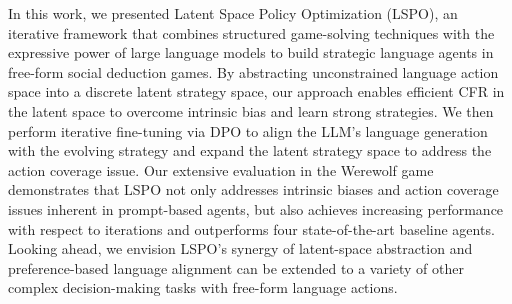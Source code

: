 In this work, we presented Latent Space Policy Optimization (LSPO), an iterative framework that combines structured game-solving techniques with the expressive power of large language models to build strategic language agents in free-form social deduction games. By abstracting unconstrained language action space into a discrete latent strategy space, our approach enables efficient CFR in the latent space to overcome intrinsic bias and learn strong strategies. We then perform iterative fine-tuning via DPO to align the LLM's language generation with the evolving strategy and expand the latent strategy space to address the action coverage issue. Our extensive evaluation in the Werewolf game demonstrates that LSPO not only addresses intrinsic biases and action coverage issues inherent in prompt-based agents, but also achieves increasing performance with respect to iterations and outperforms four state-of-the-art baseline agents. Looking ahead, we envision LSPO’s synergy of latent-space abstraction and preference-based language alignment can be extended to a variety of other complex decision-making tasks with free-form language actions.

